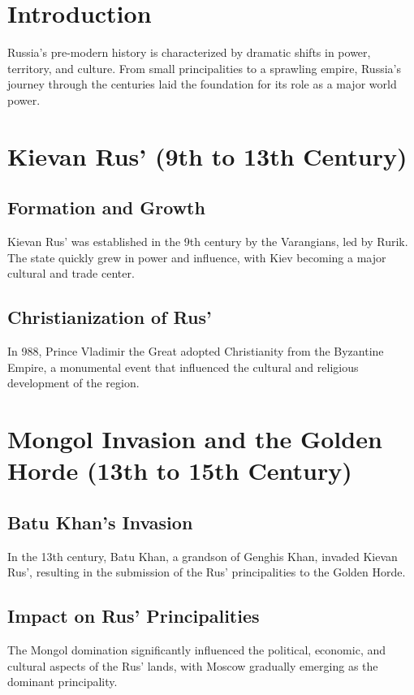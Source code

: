 \documentclass{book}
\begin{document}
\section{Introduction}
\label{sec:introduction-pre-modern-russia}
Russia's pre-modern history is characterized by dramatic shifts in power, territory, and culture. From small principalities to a sprawling empire, Russia’s journey through the centuries laid the foundation for its role as a major world power.

\section{Kievan Rus’ (9th to 13th Century)}
\label{sec:kievan-rus}
\subsection{Formation and Growth}
Kievan Rus’ was established in the 9th century by the Varangians, led by Rurik. The state quickly grew in power and influence, with Kiev becoming a major cultural and trade center.

\subsection{Christianization of Rus’}
In 988, Prince Vladimir the Great adopted Christianity from the Byzantine Empire, a monumental event that influenced the cultural and religious development of the region.

\section{Mongol Invasion and the Golden Horde (13th to 15th Century)}
\label{sec:mongol-invasion}
\subsection{Batu Khan’s Invasion}
In the 13th century, Batu Khan, a grandson of Genghis Khan, invaded Kievan Rus’, resulting in the submission of the Rus’ principalities to the Golden Horde.

\subsection{Impact on Rus’ Principalities}
The Mongol domination significantly influenced the political, economic, and cultural aspects of the Rus’ lands, with Moscow gradually emerging as the dominant principality.
\end{document}
